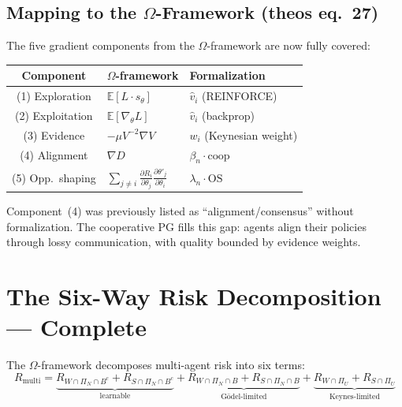 \documentclass[11pt]{article}
\begin{document}
\subsection{Mapping to the $\Omega$-Framework (theos eq.~27)}

The five gradient components from the $\Omega$-framework are now
fully covered:
\begin{center}
\begin{tabular}{cll}
\hline
\textbf{Component} & \textbf{$\Omega$-framework} & \textbf{Formalization} \\
\hline
(1) Exploration    & $\mathbb{E}[L \cdot s_\theta]$   & $\hat{v}_i$ (REINFORCE) \\
(2) Exploitation   & $\mathbb{E}[\nabla_\theta L]$    & $\hat{v}_i$ (backprop)  \\
(3) Evidence       & $-\mu V^{-2}\nabla V$            & $w_i$ (Keynesian weight) \\
(4) Alignment      & $\nabla D$                        & $\beta_n \cdot \text{coop}$ \\
(5) Opp.\ shaping  & $\sum_{j \neq i} \frac{\partial R_i}{\partial \theta_j} \frac{\partial \theta'_j}{\partial \theta_i}$ & $\lambda_n \cdot \text{OS}$ \\
\hline
\end{tabular}
\end{center}

Component~(4) was previously listed as ``alignment/consensus'' without
formalization. The cooperative PG fills this gap: agents align their
policies through lossy communication, with quality bounded by
evidence weights.


\section{The Six-Way Risk Decomposition --- Complete}

The $\Omega$-framework decomposes multi-agent risk into six terms:
\begin{equation}
  R_{\text{multi}} = \underbrace{R_{W \cap \Pi_N \cap B^c} + R_{S \cap \Pi_N \cap B^c}}_{\text{learnable}}
  + \underbrace{R_{W \cap \Pi_N \cap B} + R_{S \cap \Pi_N \cap B}}_{\text{G\"odel-limited}}
  + \underbrace{R_{W \cap \Pi_U} + R_{S \cap \Pi_U}}_{\text{Keynes-limited}}
\end{equation}
\end{document}
